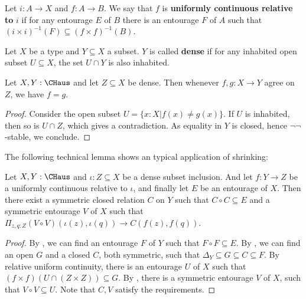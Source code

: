 \begin{definition}
  Let $i:A \to X$ and $f:A \to B$. We say that $f$ is \textbf{uniformly continuous relative to} $i$ if for any entourage $E$ of $B$ there is an entourage $F$ of $A$ such that $(i\times i)^{-1}(F) \subseteq (f \times f)^{-1}(B)$. 
\end{definition}
\begin{definition}
  Let $X$ be a type and $Y\subseteq X$ a subset. $Y$ is called \textbf{dense} if for any inhabited open subset $U\subseteq X$, the set $U \cap Y$ is also inhabited. 
\end{definition}
\begin{lemma}\label{ExtensionUnique}
  Let $X,Y:\CHaus$ and let $Z \subseteq X$ be dense. Then whenever $f,g:X \to Y$ agree on $Z$, we have $f = g$.
\end{lemma}
\begin{proof}
 Consider the open subset $U = \{x:X | f(x) \neq g(x)\}$. If $U$ is inhabited, then so is $U \cap Z$, which gives a contradiction. As equality in $Y$ is closed, hence $\neg\neg$-stable, we conclude. 
\end{proof}
The following technical lemma shows an typical application of shrinking:
\begin{lemma}\label{technicalExtension}
  Let $X,Y:\CHaus$ and $\iota: Z\subseteq X$ be a dense subset inclusion. And let $f:Y\to Z$ be a uniformly continuous relative to $\iota$, and finally let $E$ be an entourage of $X$. 
  Then there exist a symmetric closed relation $C$ on $Y$ such that $C\circ C\subseteq E$ and a symmetric entourage $V$ of $X$ such that $\Pi_{z,q:Z} (V \circ V)(\iota(z),\iota(q)) \to C (f(z),f(q))$. 
\end{lemma}
\begin{proof}
  By , we can find an entourage $F$ of $Y$ such that $F \circ F \subseteq E$. By , we can find an open $G$ and a closed $C$, both symmetric, such that $\Delta_Y \subseteq G \subseteq C \subseteq F$. %
  By relative uniform continuity, there is an entourage $U$ of $X$ such that $(f \times f)\left(U \cap \left(Z \times Z\right)\right) \subseteq G$. By , there is a symmetric entourage $V$ of $X$, such that $V\circ V \subseteq U$. 
  Note that $C,V$ satisfy the requirements. 
\end{proof}


